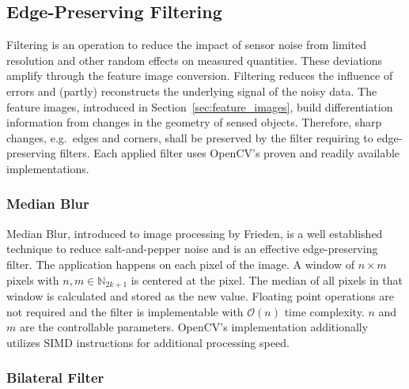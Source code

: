 \subsection{Edge-Preserving Filtering}

Filtering is an operation to reduce the impact of sensor noise from limited resolution and other random effects on measured quantities.
These deviations amplify through the feature image conversion.
Filtering reduces the influence of errors and (partly) reconstructs the underlying signal of the noisy data.
The feature images, introduced in Section~\ref{sec:feature_images}, build differentiation information from changes in the geometry of sensed objects.
Therefore, sharp changes, e.g.~edges and corners, shall be preserved by the filter requiring to edge-preserving filters.
Each applied filter uses OpenCV's\cite{opencv_library} proven and readily available implementations.

\subsubsection{Median Blur}

Median Blur, introduced to image processing by Frieden\cite{frieden_new76}, is a well established technique to reduce salt-and-pepper noise and is an effective edge-preserving filter.
The application happens on each pixel of the image.
A window of $n \times m$ pixels with $n,m \in \mathbb{N}_{2k + 1}$ is centered at the pixel.
The median of all pixels in that window is calculated and stored as the new value.
Floating point operations are not required and the filter is implementable with $\mathcal{O}(n)$\cite{huang_ieee79} time complexity.
$n$ and $m$ are the controllable parameters.
OpenCV's\cite{opencv_library} implementation additionally utilizes \acrshort{SIMD} instructions for additional processing speed.

\subsubsection{Bilateral Filter}

